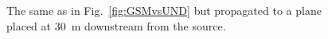 \documentclass{iopconfser}
\newcommand{\todo}[1]{{\color{red}[TODO: "#1'']}}
\begin{document}
\begin{figure}[H]
        
    \caption{The same as in Fig.~\ref{fig:GSMvsUND} but propagated to a plane placed at \SI{30}{m} downstream from the source.
    }
    \label{fig:GSMvsUND-propagated}
\end{figure}


        


        


\end{document}
